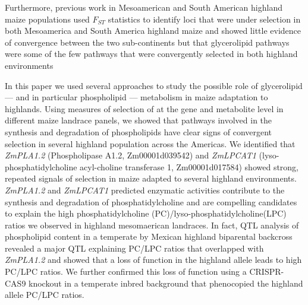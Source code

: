 \documentclass[9pt,twocolumn,twoside,lineno]{BioRxiv}
\begin{document}
Furthermore, previous work in Mesoamerican and South American highland maize populations used $F_{ST}$ statistics to identify loci that were under selection in both Mesoamerica and South America highland maize and showed little evidence of convergence between the two sub-continents but that glycerolipid pathways were some of the few pathways that were convergently selected in both highland environments  \cite{Takuno2015-uj}

In this paper we used several approaches to study the possible role of glycerolipid --- and in particular phospholipid --- metabolism in maize adaptation to highlands. 
Using measures of selection of at the gene and metabolite level in different maize landrace panels, we showed that pathways involved in the synthesis and degradation of phospholipids have clear signs of convergent selection in several highland population across the Americas. 
We identified that \textit{ZmPLA1.2} (Phospholipase A1.2, Zm00001d039542) and \textit{ZmLPCAT1} (lyso-phosphatidylcholine acyl-choline transferase 1, Zm00001d017584) showed strong, repeated signals of selection in maize adapted to several highland environments. 
\textit{ZmPLA1.2} and \textit{ZmLPCAT1} predicted enzymatic activities contribute to the synthesis and degradation of phosphatidylcholine and are compelling candidates to explain the high phosphatidylcholine (PC)/lyso-phosphatidylcholine(LPC) ratios we observed in highland mesomaerican landraces. 
In fact, QTL analysis of phospholipid content in a temperate by Mexican highland biparental backcross revealed a major QTL explaining PC/LPC ratios that overlapped with \textit{ZmPLA1.2} and showed that a loss of function in the highland allele leads to high PC/LPC ratios. 
We further confirmed this loss of function using a CRISPR-CAS9 knockout in a temperate inbred background that phenocopied the highland allele PC/LPC ratios. 
\end{document}
